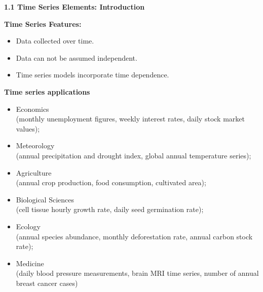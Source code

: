 \documentclass[12pt]{article} %
\date{}
\begin{document}
\textbf{\Large 1.1 Time Series Elements: Introduction}

\medskip


{}




\medskip
\medskip

\textbf{Time Series Features:}
\begin{itemize}
\item Data collected over time.
\item Data can not be assumed independent. 
\item Time series models incorporate time dependence.
\end{itemize}


\textbf{Time series applications}
\begin{itemize}
\item Economics \\(monthly unemployment figures, weekly interest rates, daily stock market values); 
\item Meteorology \\(annual precipitation and drought index, global annual temperature series); 
\item Agriculture \\(annual crop production,  food consumption, cultivated area);
\item  Biological Sciences\\ (cell tissue hourly growth rate, daily seed germination rate); 
\item Ecology \\(annual species abundance, monthly deforestation rate, annual carbon stock rate);
\item Medicine\\ (daily blood pressure measurements, brain MRI time series, number of annual breast cancer cases)
\end{itemize}
\medskip
\end{document}

